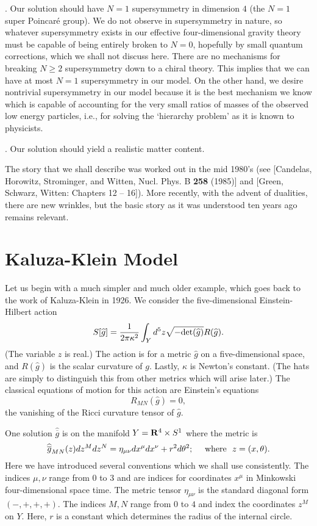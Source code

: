 \smallskip
{}. Our solution should have $N=1$  supersymmetry in dimension $4$ (the
$N=1$  super Poincar\'e group).
We do not observe in supersymmetry in nature, so whatever supersymmetry
exists in our effective four-dimensional gravity theory must be capable
of being entirely broken to $N=0$, hopefully by small quantum
corrections, which we shall not discuss here.  There are no
mechanisms for breaking $N\ge 2$  
supersymmetry down to a chiral theory. This implies that we can have
at most $N=1$ 
supersymmetry in our model.  On the other hand, we desire nontrivial
supersymmetry in our model because it is the best  mechanism we
know which is capable of accounting for the very small ratios of
masses of the observed low energy particles, i.e., for solving the
`hierarchy problem' as it is known to physicists.

\smallskip
{}. Our solution should yield a realistic matter content.

\bigskip
The story that we shall describe was worked out in the mid 1980's (see
[Candelas, Horowitz, Strominger, and Witten, Nucl. Phys. B
{\bf 258} (1985)] and [Green, Schwarz, Witten: Chapters 12 --
16]). More recently, with the  
advent of dualities, there are new wrinkles, but the basic story as it
was understood ten years ago remains relevant.


\section{Kaluza-Klein Model}

Let us begin with a much simpler and much older example, which goes
back to the work of Kaluza-Klein in 1926. We consider the 
five-dimensional Einstein-Hilbert action
$$S[\widehat{g}]=\frac{1}{2\pi\kappa^2}\int_Yd^5z\sqrt{-{\rm
det}(\widehat{g})}R(\widehat{g}).$$
(The variable $z$ is real.)
The action is for  a metric  $\widehat{g}$ on a
five-dimensional space, and $R(\widehat{g})$ is the scalar curvature
of $g$. 
Lastly, $\kappa$ is Newton's constant.  (The hats are simply to
distinguish this from other metrics which will arise later.)
The classical equations of motion for this action are Einstein's
equations 
$$R_{MN}(\widehat{g})=0,$$
the vanishing of the Ricci curvature tensor of $\widehat{g}$.

One solution $\widehat{\overline{g}}$ is on the manifold $Y={\bf R}^4\times S^1$ where the
metric is
$$\widehat{\overline{g}}_{MN}(z)dz^M dz^N=\eta_{\mu\nu}dx^\mu
dx^\nu+r^2d\theta^2;\ \ \  
\ {\rm where}\ \ z=(x,\theta).$$
Here we have introduced several conventions which we shall use
consistently. The indices
$\mu,\nu$ range from $0$ to $3$ and are indices for coordinates
$x^\mu$ in Minkowski four-dimensional space time.  The metric tensor
$\eta_{\mu\nu}$ is the standard diagonal form $(-,+,+,+)$. 
The indices $M,N$ range from $0$ to $4$ and index the  coordinates
$z^M$ on $Y$. Here, $r$ is a constant which determines the radius of
the internal circle.

